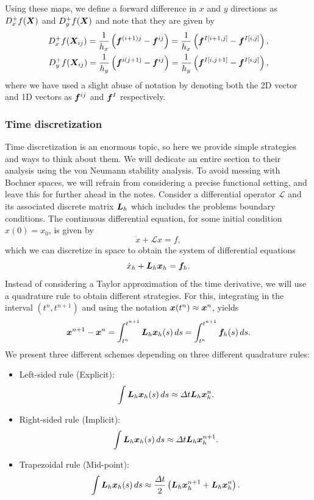 \documentclass{article}
\renewcommand{\vec}{\vectorsym}
\newcommand{\mat}{\matrixsym}
\begin{document}
Using these maps, we define a forward difference in $x$ and $y$ directions as $D^+_xf(\vec X)$ and $D^+_yf(\vec X)$ and note that they are given by
    \begin{align*}
        D^+_x f(\vec X_{ij}) = \frac 1{h_x} \left(\vec f^{(i+1)j} - \vec f^{ij}\right)= \frac 1 {h_x} \left( \vec f^{I[i+1,j]} - \vec f^{I[i,j]}\right), \\
        D^+_y f(\vec X_{ij}) = \frac 1{h_y} \left(\vec f^{i(j+1)} - \vec f^{ij}\right) = \frac 1{h_y} \left(\vec f^{I[i,j+1]} - \vec f^{I[i,j]}\right),
    \end{align*}
    where we have used a slight abuse of notation by denoting both the 2D vector and 1D vectors as $\vec f^{ij}$ and $\vec f^I$ respectively. 
    
\subsubsection{Time discretization}
Time discretization is an enormous topic, so here we provide simple strategies and ways to think about them. We will dedicate an entire section to their analysis using the von Neumann stability analysis. To avoid messing with Bochner spaces, we will refrain from considering a precise functional setting, and leave this for further ahead in the notes. Consider a differential operator $\mathcal L$ and its associated discrete matrix $\mat L_h$ which includes the problems boundary conditions. The continuous differential equation, for some initial condition $x(0) = x_0$, is given by 
    $$ \dot x + \mathcal L x = f, $$
    which we can discretize in space to obtain the system of differential equations
    $$ \dot x_h + \mat L_h \vec x_h = \vec f_h. $$
    Instead of considering a Taylor approximation of the time derivative, we will use a quadrature rule to obtain different strategies. For this, integrating in the interval $(t^n, t^{n+1})$ and using the notation $\vec x(t^n) \approx \vec x^{n}$, yields
    $$ \vec x^{n+1} - \vec x^n = \int_{t^n}^{t^{n+1}} \mat L_h \vec x_h(s) \,ds = \int_{t^n}^{t^{n+1}} \vec f_h(s)\,ds. $$
    We present three different schemes depending on three different quadrature rules: 
    \begin{itemize}
        \item Left-sided rule (Explicit):
                $$ \int \mat L_h \vec x_h(s)\,ds \approx \Delta t \mat L_h\vec x_h^n. $$
        \item  Right-sided rule (Implicit): 
            $$ \int \mat L_h \vec x_h(s)\,ds \approx \Delta t\mat L_h\vec x_h^{n+1}. $$
        \item  Trapezoidal rule (Mid-point): 
            $$ \int \mat L_h \vec x_h(s)\,ds \approx \frac{\Delta t}{2}\left(\mat L_h\vec x_h^{n+1}+ \mat L_h \vec x_h^n\right). $$
    \end{itemize}
\end{document}
